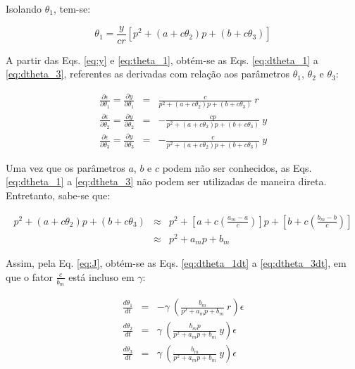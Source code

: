 Isolando $\theta_1$, tem-se:

\begin{equation}\label{eq:theta_1}
\theta_1 = \frac{y}{cr}\left[ p^2 + (a + c\theta_2)p + (b + c\theta_3) \right]
\end{equation}

A partir das Eqs. \ref{eq:y} e \ref{eq:theta_1}, obtém-se as Eqs.
\ref{eq:dtheta_1} a \ref{eq:dtheta_3}, referentes as derivadas com relação aos
parâmetros $\theta_1$, $\theta_2$ e $\theta_3$:

\begin{eqnarray}
\frac{\partial \epsilon}{\partial \theta_1} = \frac{\partial y}{\partial \theta_1} & = &
    \frac{c}{p^2 + (a + c\theta_2)p + (b + c\theta_3)}\ r 
    \label{eq:dtheta_1}\\
\frac{\partial \epsilon}{\partial \theta_2} = \frac{\partial y}{\partial \theta_2}  & = &
    -\frac{cp}{p^2 + (a + c\theta_2)p + (b + c\theta_3)}\ y 
    \label{eq:dtheta_2}\\
\frac{\partial \epsilon}{\partial \theta_3} = \frac{\partial y}{\partial \theta_3}  & = &
    -\frac{c}{p^2 + (a + c\theta_2)p + (b + c\theta_3)}\ y 
    \label{eq:dtheta_3}
\end{eqnarray}

Uma vez que os parâmetros $a$, $b$ e $c$ podem não ser conhecidos, as Eqs.
\ref{eq:dtheta_1} a \ref{eq:dtheta_3} não podem ser utilizadas de maneira
direta. Entretanto, sabe-se que:

\begin{eqnarray}
p^2 + (a + c\theta_2)p + (b + c\theta_3) & \approx & 
p^2 + 
\left[a + c\left( \frac{a_m - a}{c} \right)\right]p + 
\left[b + c\left( \frac{b_m - b}{c} \right)\right] \nonumber\\ 
 & \approx & p^2 + a_mp + b_m \nonumber
\end{eqnarray}

Assim, pela Eq. \ref{eq:J}, obtém-se as Eqs. \ref{eq:dtheta_1dt} a
\ref{eq:dtheta_3dt}, em que o fator $\frac{c}{b_m}$ está incluso em $\gamma$:

\begin{eqnarray}
\frac{d\theta_1}{dt} & = & -\gamma\ \left(\frac{b_m}
                                             {p^2 + a_mp + b_m}\ r
                                  \right)\epsilon \label{eq:dtheta_1dt}\\
\frac{d\theta_2}{dt} & = & \gamma\ \left(\frac{b_m p}
                                            {p^2 + a_mp + b_m}\ y
                                 \right)\epsilon \label{eq:dtheta_2dt}\\
\frac{d\theta_3}{dt} & = & \gamma\ \left(\frac{b_m}
                                          {p^2 + a_mp + b_m}\ y
                               \right)\epsilon \label{eq:dtheta_3dt}
\end{eqnarray}

